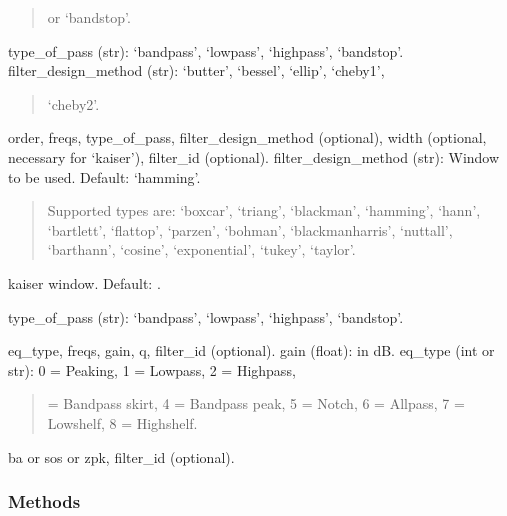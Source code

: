 \documentclass[letterpaper,10pt,english]{sphinxmanual}
\begin{document}
\begin{fulllineitems}
\begin{fulllineitems}
\begin{description}
\begin{quote}
\sphinxAtStartPar
or ‘bandstop’.
\end{quote}

\sphinxAtStartPar
type\_of\_pass (str): ‘bandpass’, ‘lowpass’, ‘highpass’, ‘bandstop’.
filter\_design\_method (str): ‘butter’, ‘bessel’, ‘ellip’, ‘cheby1’,
\begin{quote}

\sphinxAtStartPar
‘cheby2’.
\end{quote}

\sphinxAtStartPar
order, freqs, type\_of\_pass, filter\_design\_method (optional),
width (optional, necessary for ‘kaiser’), filter\_id (optional).
filter\_design\_method (str): Window to be used. Default: ‘hamming’.
\begin{quote}

\sphinxAtStartPar
Supported types are: ‘boxcar’, ‘triang’, ‘blackman’, ‘hamming’,
‘hann’, ‘bartlett’, ‘flattop’, ‘parzen’, ‘bohman’,
‘blackmanharris’, ‘nuttall’, ‘barthann’, ‘cosine’,
‘exponential’, ‘tukey’, ‘taylor’.
\end{quote}
\begin{description}
\sphinxAtStartPar
kaiser window. Default: .

\end{description}

\sphinxAtStartPar
type\_of\_pass (str): ‘bandpass’, ‘lowpass’, ‘highpass’, ‘bandstop’.

\sphinxAtStartPar
eq\_type, freqs, gain, q, filter\_id (optional).
gain (float): in dB.
eq\_type (int or str): 0 = Peaking, 1 = Lowpass, 2 = Highpass,
\begin{quote}

 = Bandpass skirt, 4 = Bandpass peak, 5 = Notch, 6 = Allpass,
7 = Lowshelf, 8 = Highshelf.
\end{quote}

\sphinxAtStartPar
ba or sos or zpk, filter\_id (optional).

\end{description}
\subsubsection*{Methods}



\end{fulllineitems}
\end{fulllineitems}
\end{document}
